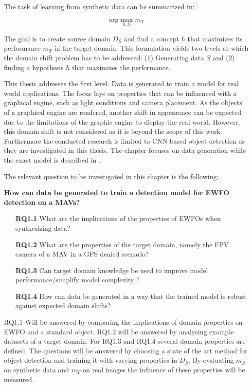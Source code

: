 The task of learning from synthetic data can be summarized in:

$$
\text{arg}\max\limits_{h,S} m_T
$$

The goal is to create source domain $D_S$ and find a concept $h$ that maximizes its performance $m_T$ in the target domain. This formulation yields two levels at which the domain shift problem has to be addressed: (1) Generating data $S$ and (2) finding a hypothesis $h$ that maximizes the performance.

This thesis addresses the first level. Data is generated to train a model for real world applications. The focus lays on properties that can be influenced with a graphical engine, such as light conditions and camera placement. As the objects of a graphical engine are rendered, another shift in appearance can be expected due to the limitations of the graphic engine to display the real world. However, this domain shift is not considered as it is beyond the scope of this work. Furthermore the conducted research is limited to \ac{CNN}-based object detection as they are investigated in this thesis. The chapter focuses on data generation while the exact model is described in .

The relevant question to be investigated in this chapter is the following:

\textbf{How can data be generated to train a detection model for \ac{EWFO} detection on a \acp{MAV}?}

\begin{enumerate}
	\item[\textbf{RQ1.1}]What are the implications of the properties of \acp{EWFO} when synthesizing data?
	\item[\textbf{RQ1.2}]What are the properties of the target domain, namely the \ac{FPV} camera of a \ac{MAV} in a GPS denied scenario?
	\item[\textbf{RQ1.3}]Can target domain knowledge be used to improve model performance/simplify model complexity ?
	\item[\textbf{RQ1.4}]How can data be generated in a way that the trained model is robust against expected domain shifts?
\end{enumerate}

RQ1.1 Will be answered by comparing the implications of domain properties on \ac{EWFO} and a standard object. RQ1.2 will be answered by analysing example datasets of a target domain. For RQ1.3 and RQ1.4 several domain properties are defined. The questions will be answered by choosing a state of the art method for object detection and training it with varying properties in $D_S$. By evaluating $m_S$ on synthetic data and $m_T$ on real images the influence of these properties will be measured.

